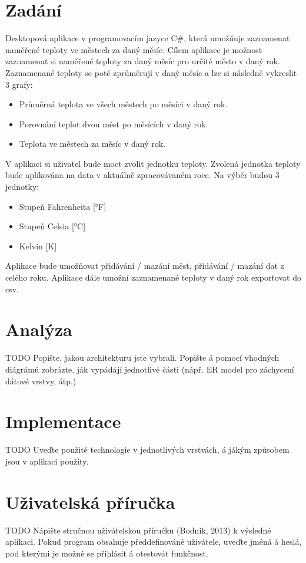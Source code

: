 \documentclass[12pt, a4paper]{article}
\begin{document}
\newpage
\tableofcontents

\newpage
\section{Zadání}
Desktopová aplikace v programovacím jazyce C\#, která umožňuje zaznamenat naměřené teploty ve městech za daný měsíc. Cílem aplikace je možnost zaznamenat si naměřené teploty za daný měsíc pro určité město v daný rok. Zaznamenané teploty se poté zprůměrují v daný měsíc a lze si následně vykreslit 3 grafy:
\begin{itemize}
\item Průměrná teplota ve všech městech po měsíci v daný rok.
\item Porovnání teplot dvou měst po měsících v daný rok.
\item Teplota ve městech za měsíc v daný rok.
\end{itemize}
V aplikaci si uživatel bude moct zvolit jednotku teploty. Zvolená jednotka teploty bude aplikována na data v aktuálně zpracovávaném roce. Na výběr budou 3 jednotky:
\begin{itemize}
\item Stupeň Fahrenheita [°F]
\item Stupeň Celsia [°C]
\item Kelvin [K]
\end{itemize}
Aplikace bude umožňovat přidávání / mazání měst, přidávání / mazání dat z celého roku. Aplikace dále umožní zaznamenané teploty v daný rok exportovat do csv.

\section{Analýza}
TODO
\newline
Popište, jakou architekturu jste vybrali. Popište á pomocí vhodných diágrámů zobrázte, ják vypádájí jednotlivé části (nápř. ER model pro záchycení dátové vrstvy, átp.)

\section{Implementace}
TODO
\newline
Uveďte použité technologie v jednotlivých vrstvách, á jákým způsobem jsou v aplikaci použity.

\section{Uživatelská příručka}
TODO
\newline
Nápište stručnou uživátelskou příručku (Bodnik, 2013) k výsledné aplikaci. Pokud program obsahuje předdefinováné uživátele, uveďte jméná á heslá, pod kterými je možné se přihlásit á otestovát funkčnost.
\end{document}
